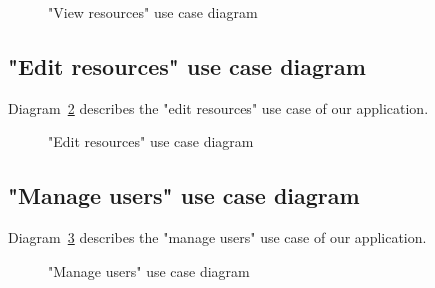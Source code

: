 \begin{figure}[H]
	\centerfloat

	\caption{"View resources" use case diagram}
	\label{fig:view-use-case-diagram}
\end{figure}

\subsection{"Edit resources" use case diagram}
Diagram~\ref{fig:edit-use-case-diagram} describes the "edit resources" use case of our application.

\begin{figure}[H]
	\centerfloat

	\caption{"Edit resources" use case diagram}
	\label{fig:edit-use-case-diagram}
\end{figure}

\subsection{"Manage users" use case diagram}
Diagram~\ref{fig:manage-use-case-diagram} describes the "manage users" use case of our application.

\begin{figure}[H]
	\centerfloat

	\caption{"Manage users" use case diagram}
	\label{fig:manage-use-case-diagram}
\end{figure}


